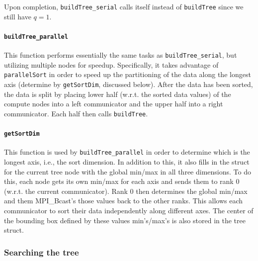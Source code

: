 \documentclass{article}
\begin{document}
%
%

Upon completion, \texttt{buildTree\_serial} calls itself instead of \texttt{buildTree} since we still have $q=1$.


\paragraph{\texttt{buildTree\_parallel}}
This function performs essentially the same tasks as \texttt{buildTree\_serial}, but utilizing multiple nodes for speedup. Specifically, it takes advantage of \texttt{parallelSort} in order to speed up the partitioning of the data along the longest axis (determine by \texttt{getSortDim}, discussed below). After the data has been sorted, the data is split by placing lower half (w.r.t. the sorted data values) of the compute nodes into a left communicator and the upper half into a right communicator. Each half then calls \texttt{buildTree}.



\paragraph{\texttt{getSortDim}}
This function is used by \texttt{buildTree\_parallel} in order to determine which is the longest axis, i.e., the sort dimension. In addition to this, it also fills in the struct for the current tree node with the global min/max in all three dimensions. To do this, each node gets its own min/max for each axis and sends them to rank 0 (w.r.t. the current communicator). Rank 0 then determines the global min/max and them MPI\_Bcast's those values back to the other ranks. This allows each communicator to sort their data independently along different axes. The center of the bounding box defined by these values min's/max's is also stored in the tree struct. 


\subsubsection{Searching the tree}
\end{document}
